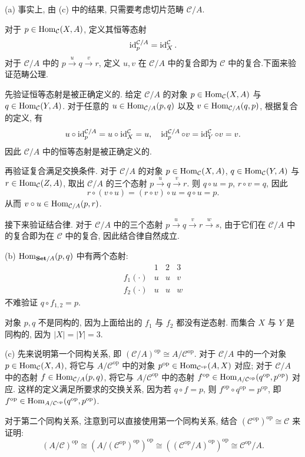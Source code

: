 \documentclass{article}
\newcommand{\op}{^{\mathrm{op}}}
\begin{document}
\begin{solution}
	(a) 事实上, 由 (c) 中的结果, 只需要考虑切片范畴 $\mathcal{C}/A$.

	对于 $p\in \operatorname{Hom}_{\mathcal{C}}(X,A)$, 定义其恒等态射
	\[ \operatorname{id}_p^{\mathcal{C}/A} = \operatorname{id}_X^{\mathcal{C}}. \]
	对于 $\mathcal{C}/A$ 中的 $p \xrightarrow{u} q \xrightarrow{v} r$, 定义 $u,v$ 在 $\mathcal{C}/A$ 中的复合即为 $\mathcal{C}$ 中的复合.下面来验证范畴公理.

	先验证恒等态射是被正确定义的. 给定 $\mathcal{C}/A$ 的对象 $p\in \operatorname{Hom}_{\mathcal{C}}(X,A)$ 与 $q\in \operatorname{Hom}_{\mathcal{C}}(Y,A)$. 对于任意的 $u \in \operatorname{Hom}_{\mathcal{C}/A}(p,q)$ 以及 $v \in \operatorname{Hom}_{\mathcal{C}/A}(q,p)$, 根据复合的定义, 有
	\[ u \circ \operatorname{id}_p^{\mathcal{C}/A} = u \circ \operatorname{id}_X^{\mathcal{C}} = u,\quad
	\operatorname{id}_p^{\mathcal{C}/A} \circ v = \operatorname{id}_Y^{\mathcal{C}} \circ v = v. \]
	因此 $\mathcal{C}/A$ 中的恒等态射是被正确定义的. 

	再验证复合满足交换条件. 对于 $\mathcal{C}/A$ 的对象 $p\in \operatorname{Hom}_\mathcal{C} (X,A)$, $q\in \operatorname{Hom}_\mathcal{C} (Y,A)$ 与 $r\in \operatorname{Hom}_{\mathcal{C}}(Z,A)$, 取出 $\mathcal{C}/A$ 的三个态射 $p \xrightarrow{u} q \xrightarrow{v} r$. 则 $q \circ u = p$, $r \circ v = q$, 因此
	\[ r \circ (v \circ u) = (r \circ v) \circ u = q \circ u =p. \]
	从而 $v\circ u \in \operatorname{Hom}_{\mathcal{C}/A}(p,r)$. 

	接下来验证结合律. 对于 $\mathcal{C}/A$ 中的三个态射 $p \xrightarrow{u} q \xrightarrow{v} r \xrightarrow{w} s$, 由于它们在 $\mathcal{C}/A$ 中的复合即为在 $\mathcal{C}$ 中的复合, 因此结合律自然成立.

	(b) $\operatorname{Hom}_{\mathbf{Set}/A}(p,q)$ 中有两个态射: 
	\[ 
		\begin{array}{c|ccc}
			& 1 & 2 & 3 \\ \hline
			f_1(\cdot) & u & u & v \\
			f_2(\cdot) & u & u & w
		\end{array}
	\]
	不难验证 $q \circ f_{1,2} = p$. 

	对象 $p,q$ 不是同构的, 因为上面给出的 $f_1$ 与 $f_2$ 都没有逆态射. 而集合 $X$ 与 $Y$ 是同构的, 因为 $|X| = |Y| = 3$. 

	(c) 先来说明第一个同构关系, 即 $(\mathcal{C}/A)\op \cong A/\mathcal{C}\op$. 对于 $\mathcal{C}/A$ 中的一个对象 $p \in \operatorname{Hom}_{\mathcal{C}}(X,A)$, 将它与 $A/\mathcal{C}\op$ 中的对象 $p\op \in \Hom_{\mathcal{C}\op}(A,X)$ 对应; 对于 $\mathcal{C}/A$ 中的态射 $f \in \operatorname{Hom}_{\mathcal{C}/A} (p,q)$, 将它与 $A/\mathcal{C}\op$ 中的态射 $f\op \in \Hom_{A/\mathcal{C}\op}(q\op,p\op)$ 对应. 这样的定义满足所要求的交换关系, 因为若 $q \circ f = p$, 则 $f\op \circ q\op = p\op$, 即 $f\op \in \Hom_{A/\mathcal{C}\op}(q\op,p\op)$.

	对于第二个同构关系, 注意到可以直接使用第一个同构关系, 结合 $(\mathcal{C}\op)\op \cong \mathcal{C}$ 来证明: 
	\[ (A/\mathcal{C})\op 
	\cong (A/(\mathcal{C}\op)\op)\op
	\cong ((\mathcal{C}\op/A)\op)\op
	\cong \mathcal{C}\op/A. \]
\end{solution}
\end{document}
